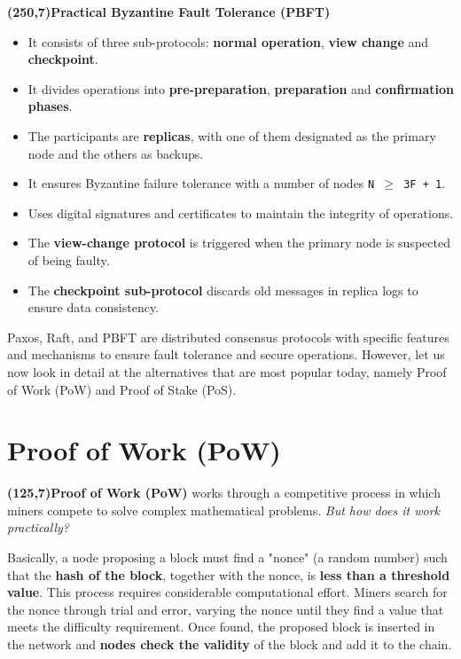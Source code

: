 \colorbox{Orange!70}{\textbf{\makebox(250,7){Practical Byzantine Fault Tolerance (PBFT)}}}
\vspace{-0.3cm}
\begin{itemize}
    \item It consists of three sub-protocols: \textbf{normal operation}, \textbf{view change} and \textbf{checkpoint}.
    \item It divides operations into \textbf{pre-preparation}, \textbf{preparation} and \textbf{confirmation phases}.
    \item The participants are \textbf{replicas}, with one of them designated as the primary node and the others as backups.
    \item It ensures Byzantine failure tolerance with a number of nodes \texttt{N $\geq$ 3F + 1}.
    \item Uses digital signatures and certificates to maintain the integrity of operations.
    \item The \textbf{view-change protocol} is triggered when the primary node is suspected of being faulty.
    \item The \textbf{checkpoint sub-protocol} discards old messages in replica logs to ensure data consistency.
\end{itemize}

Paxos, Raft, and PBFT are distributed consensus protocols with specific features and mechanisms to ensure fault tolerance and secure operations. However, let us now look in detail at the alternatives that are most popular today, namely Proof of Work (PoW) and Proof of Stake (PoS).

\section{Proof of Work (PoW)}
\colorbox{Orange!70}{\textbf{\makebox(125,7){Proof of Work (PoW)}}} works through a competitive process in which miners compete to solve complex mathematical problems. \textit{But how does it work practically?}

Basically, a node proposing a block must find a "nonce" (a random number) such that the \textbf{hash of the block}, together with the nonce, is \textbf{less than a threshold value}. This process requires considerable computational effort. Miners search for the nonce through trial and error, varying the nonce until they find a value that meets the difficulty requirement. Once found, the proposed block is inserted in the network and \textbf{nodes check the validity} of the block and add it to the chain.

